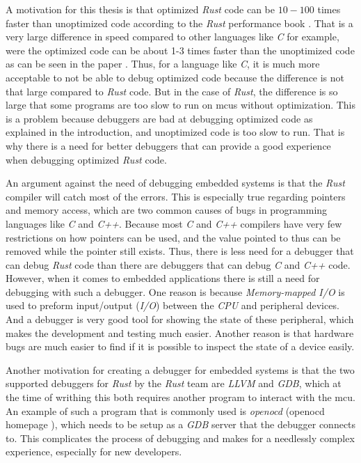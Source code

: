 A motivation for this thesis is that optimized \emph{Rust} code can be $10-100$ times faster than unoptimized code according to the \emph{Rust} performance book \cite{perf-book}.
That is a very large difference in speed compared to other languages like \emph{C} for example, were the optimized code can be about 1-3 times faster than the unoptimized code as can be seen in the paper \cite{clang-opt}.
Thus, for a language like \emph{C}, it is much more acceptable to not be able to debug optimized code because the difference is not that large compared to \emph{Rust} code.
But in the case of \emph{Rust}, the difference is so large that some programs are too slow to run on \glspl{mcu} without optimization.
This is a problem because debuggers are bad at debugging optimized code as explained in the introduction, and unoptimized code is too slow to run.
That is why there is a need for better debuggers that can provide a good experience when debugging optimized \emph{Rust} code.


An argument against the need of debugging embedded systems is that the \emph{Rust} compiler will catch most of the errors.
This is especially true regarding pointers and memory access, which are two common causes of bugs in programming languages like \emph{C} and \emph{C++}.
Because most \emph{C} and \emph{C++} compilers have very few restrictions on how pointers can be used, and the value pointed to thus can be removed while the pointer still exists. 
Thus, there is less need for a debugger that can debug \emph{Rust} code than there are debuggers that can debug \emph{C} and \emph{C++} code.
However, when it comes to embedded applications there is still a need for debugging with such a debugger.
One reason is because \emph{Memory-mapped I/O} is used to preform input/output (\emph{I/O}) between the \emph{CPU} and peripheral devices.
And a debugger is very good tool for showing the state of these peripheral, which makes the development and testing much easier.
Another reason is that hardware bugs are much easier to find if it is possible to inspect the state of a device easily.


Another motivation for creating a debugger for embedded systems is that the two supported debuggers for \emph{Rust} by the \emph{Rust} team are \emph{LLVM} and \emph{GDB}, which at the time of writhing this both requires another program to interact with the \gls{mcu}.
An example of such a program that is commonly used is \emph{openocd} (openocd homepage \cite{openocd}), which needs to be setup as a \emph{GDB} server that the debugger connects to.
This complicates the process of debugging and makes for a needlessly complex experience, especially for new developers.


